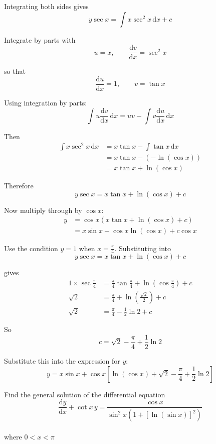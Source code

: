 \documentclass[leqno]{article}
\begin{document}
\begin{enumerate}[
  label=\textbf{\arabic*.},
  leftmargin=*,
  topsep=0pt,
  partopsep=0pt,
  parsep=0pt
]
\begin{djsSolution}
\begin{enumerate}[label=\textbf{(\alph*)}]
Integrating both sides gives
\[
y\sec x=\int x\sec^2 x\,\mathrm{d}x+c
\]

Integrate by parts with
\[
u=x,\qquad \frac{\mathrm{d}v}{\mathrm{d}x}=\sec^2 x
\]

so that
\[
\frac{\mathrm{d}u}{\mathrm{d}x}=1,\qquad v=\tan x
\]

Using integration by parts:
\[
\int u\frac{\mathrm{d}v}{\mathrm{d}x}\,\mathrm{d}x = uv - \int v\frac{\mathrm{d}u}{\mathrm{d}x}\,\mathrm{d}x
\]

Then
\begin{align*}
\int x\sec^2 x\,\mathrm{d}x
&=x\tan x-\int \tan x\,\mathrm{d}x \\
&=x\tan x-(-\ln(\cos x)) \\
&=x\tan x+\ln(\cos x)
\end{align*}

Therefore
\[
y\sec x=x\tan x+\ln(\cos x)+c
\]

Now multiply through by $\cos x$:
\begin{align*}
y&=\cos x\left(x\tan x+\ln(\cos x)+c\right) \\
&=x\sin x+\cos x\ln(\cos x)+c\cos x
\end{align*}

Use the condition $y=1$ when $x=\frac{\pi}{4}$. Substituting into
\[
y\sec x=x\tan x+\ln(\cos x)+c
\]

gives
\begin{align*}
1\times \sec\frac{\pi}{4}
&=\frac{\pi}{4}\tan\frac{\pi}{4}+\ln\left(\cos\frac{\pi}{4}\right)+c \\
\sqrt{2}
&=\frac{\pi}{4}+\ln\left(\frac{\sqrt{2}}{2}\right)+c \\
\sqrt{2}
&=\frac{\pi}{4}-\frac{1}{2}\ln 2+c
\end{align*}

So
\[
c=\sqrt{2}-\frac{\pi}{4}+\frac{1}{2}\ln 2
\]

Substitute this into the expression for $y$:
\[
y=x\sin x+\cos x\left[\ln(\cos x)+\sqrt{2}-\frac{\pi}{4}+\frac{1}{2}\ln 2\right]
\]
  \end{enumerate}
\end{djsSolution}


\newpage

\questionitem

Find the general solution of the differential equation\\
\[
\frac{\mathrm{d}y}{\mathrm{d}x}+\cot x\,y=\frac{\cos x}{\sin^2 x\left(1+\left[\ln(\sin x)\right]^2\right)}
\]\\
where $0<x<\pi$ 


\end{enumerate}
\end{document}
